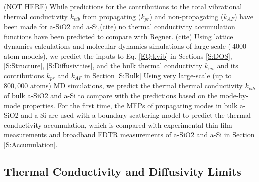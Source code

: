 \documentclass[aps,prb,onecolumn,preprint,superscriptaddress,footinbib,amsmath,amssymb,floatfix]{revtex4}
\begin{document}
(NOT HERE)
While predictions for the contributions to the total 
vibrational thermal conductivity $k_{vib}$ from 
propagating ($k_{pr}$) and non-propagating ($k_{AF}$) have 
been made for a-SiO2 and a-Si,(cite) no thermal conductivity 
accumulation functions have been predicted to compare with Regner.
(cite) 
Using lattice dynamics calculations and molecular dynamics simulations 
of large-scale ($~4000$ atom models), 
we predict the inputs to Eq. \eqref{EQ:kvib} in Sections \ref{S:DOS}, 
\ref{S:Structure}, \ref{S:Diffusivities}, and the bulk thermal 
conductivity 
$k_{vib}$ and its contributions $k_{pr}$ and $k_{AF}$ in Section 
\ref{S:Bulk} 
Using very large-scale (up to $800,000$ atoms) 
MD simulations, we predict the thermal 
thermal conductivity $k_{vib}$ of bulk a-SiO2 and a-Si to compare with 
the predictions based on the mode-by-mode properties. 
For the first time, the MFPs of propagating modes in bulk 
a-SiO2 and a-Si are used with a boundary scattering model 
to predict the thermal conductivity accumulation, which is 
compared with experimental thin film measurements and broadband 
FDTR measurements of a-SiO2 and a-Si in Section \ref{S:Accumulation}.

\subsection{\label{S:Limits}Thermal Conductivity and Diffusivity Limits}
\end{document}

